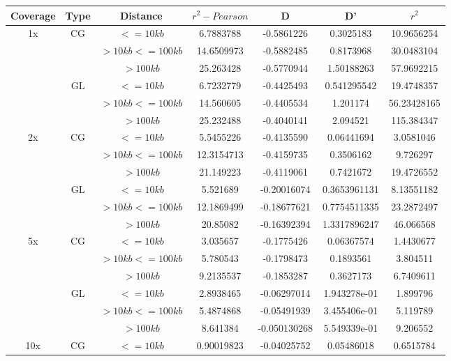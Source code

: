 \documentclass[a4paper]{article}
\begin{document}
\begin{table}[H]
\centering
\begin{tabular}{c|c|c|c|c|c|c}
Coverage & Type & Distance & $r^2 - Pearson$ & D & D' & $r^2$ \\
\hline
\multirow{6}{*}{1x} & \multirow{3}{*}{CG} & $<=10kb$ & 6.7883788 & -0.5861226 & 0.3025183 & 10.9656254 \\
& & $>10kb <=100kb$ & 14.6509973 & -0.5882485 & 0.8173968 & 30.0483104 \\
& & $>100kb$ & 25.263428 & -0.5770944 & 1.50188263 & 57.9692215 \\
\cline{2-7}
& \multirow{3}{*}{GL} & $<=10kb$ & 6.7232779 & -0.4425493 & 0.541295542 & 19.4748357 \\
& & $>10kb <=100kb$ & 14.560605 & -0.4405534 & 1.201174 & 56.23428165 \\
& & $>100kb$ & 25.232488 & -0.4040141 & 2.094521 & 115.384347 \\
\hline
\multirow{6}{*}{2x} & \multirow{3}{*}{CG} & $<=10kb$ & 5.5455226 & -0.4135590 & 0.06441694 & 3.0581046 \\
& & $>10kb <=100kb$ & 12.3154713 & -0.4159735 & 0.3506162 & 9.726297 \\
& & $>100kb$ & 21.149223 & -0.4119061 & 0.7421672 & 19.4726552 \\
\cline{2-7}
& \multirow{3}{*}{GL} & $<=10kb$ & 5.521689 & -0.20016074 & 0.3653961131 & 8.13551182 \\
& & $>10kb <=100kb$ & 12.1869499 & -0.18677621 & 0.7754511335 & 23.2872497 \\
& & $>100kb$ & 20.85082 & -0.16392394 & 1.3317896247 & 46.066568 \\
\hline
\multirow{6}{*}{5x} & \multirow{3}{*}{CG} & $<=10kb$ & 3.035657 & -0.1775426 & 0.06367574 & 1.4430677 \\
& & $>10kb <=100kb$ & 5.780543 & -0.1798473 & 0.1893561 & 3.804511 \\
& & $>100kb$ & 9.2135537 & -0.1853287 & 0.3627173 & 6.7409611 \\
\cline{2-7}
& \multirow{3}{*}{GL} & $<=10kb$ & 2.8938465 & -0.06297014 & 1.943278e-01 & 1.899796 \\
& & $>10kb <=100kb$ & 5.4874868 & -0.05491939 & 3.455406e-01 & 5.119789 \\
& & $>100kb$ & 8.641384 & -0.050130268 & 5.549339e-01 & 9.206552 \\
\hline
\multirow{6}{*}{10x} & \multirow{3}{*}{CG} & $<=10kb$ & 0.90019823 & -0.04025752 & 0.05486018 & 0.6515784 \\

\end{tabular}
\end{table}
\end{document}
